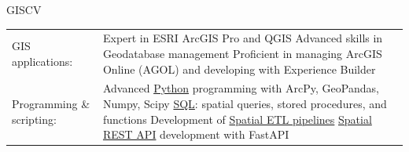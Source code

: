 \documentclass[letterpaper]{article}
\newenvironment{skillslist}
        {
            \hspace*{-0.07in}\begin{tabular}[t]{ l L{5.17in} }
        }{
            \end{tabular}
        }
\newcommand{\impt}[1]{\uline{#1}}
\begin{document}
    \begin{taggedblock}{GISCV}
        \begin{skillslist}
            GIS applications:&
                Expert in ESRI ArcGIS Pro and QGIS \linebreak
                Advanced skills in Geodatabase management\linebreak
                Proficient in managing ArcGIS Online (AGOL) and developing with Experience Builder \linebreak
                \\
            Programming \& scripting:&
                Advanced \impt{Python} programming with ArcPy, GeoPandas, Numpy, Scipy\linebreak
                \impt{SQL}: spatial queries, stored procedures, and functions \linebreak
                Development of \impt{Spatial ETL pipelines} \linebreak
                \impt{Spatial REST API} development with FastAPI \linebreak
                \\

\end{skillslist}
\end{taggedblock}
\end{document}
